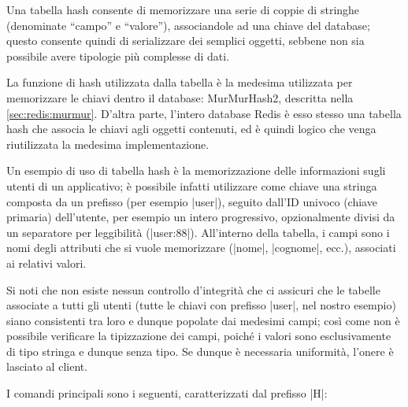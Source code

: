 Una tabella hash consente di memorizzare una serie di coppie di stringhe (denominate ``campo'' e
``valore''), associandole ad una chiave del database; questo consente quindi di serializzare dei
semplici oggetti, sebbene non sia possibile avere tipologie più complesse di dati.

La funzione di hash utilizzata dalla tabella è la medesima utilizzata per memorizzare le chiavi
dentro il database: MurMurHash2, descritta nella \autoref{sec:redis:murmur}. D'altra parte, l'intero
database Redis è esso stesso una tabella hash che associa le chiavi agli oggetti contenuti, ed è
quindi logico che venga riutilizzata la medesima implementazione.

Un esempio di uso di tabella hash è la memorizzazione delle informazioni sugli utenti di un
applicativo; è possibile infatti utilizzare come chiave una stringa composta da un prefisso (per
esempio \cverb|user|), seguito dall'ID univoco (chiave primaria) dell'utente, per esempio un intero
progressivo, opzionalmente divisi da un separatore per leggibilità (\cverb|user:88|). All'interno
della tabella, i campi sono i nomi degli attributi che si vuole memorizzare (\cverb|nome|,
\cverb|cognome|, ecc.), associati ai relativi valori.

Si noti che non esiste nessun controllo d'integrità che ci assicuri che le tabelle associate a tutti
gli utenti (tutte le chiavi con prefisso \cverb|user|, nel nostro esempio) siano consistenti tra loro
e dunque popolate dai medesimi campi; così come non è possibile verificare la tipizzazione dei
campi, poiché i valori sono esclusivamente di tipo stringa e dunque senza tipo. Se dunque è
necessaria uniformità, l'onere è lasciato al client.

I comandi principali sono i seguenti, caratterizzati dal prefisso \cverb|H|:

